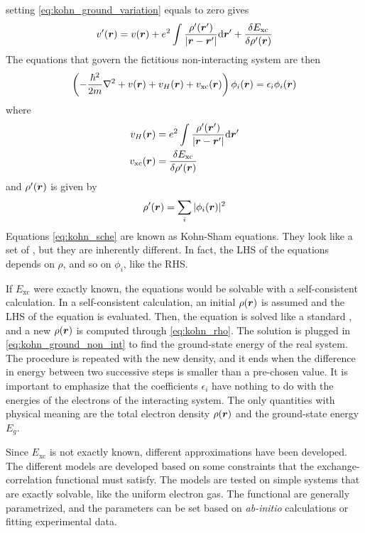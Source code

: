 setting \cref{eq:kohn_ground_variation} equals to zero gives
\begin{equation}
    \rr{v'} = \rr{v} + e^2 \int \frac{\rho'(\vec{r}')}{|\vec{r}-\vec{r}'|} \dr' + \frac{\delta E_\text{xc}}{\delta\rr{\rho'}}
\end{equation}
The equations that govern the fictitious non-interacting system are then
\begin{equation} \label{eq:kohn_sche}
    \left(-\frac{\hbar^2}{2m} \laplacian + \rr{v} + \rr{v_H} + \rr{v_\text{xc}} \right) \rr{\phi_i} = \epsilon_i \rr{\phi_i}
\end{equation}
where
\begin{align}
    \rr{v_H}         & = e^2 \int \frac{\rho'(\vec{r}')}{|\vec{r}-\vec{r}'|} \dr' \\
    \rr{v_\text{xc}} & =  \frac{\delta E_\text{xc}}{\delta\rr{\rho'}}
\end{align}
and $\rho'(\mathbf{\boldsymbol{r}})$ is given by
\begin{equation} \label{eq:kohn_rho}
    \rho'(\mathbf{\boldsymbol{r}}) = \sum_i |\phi_i(\mathbf{\boldsymbol{r}})|^2
\end{equation}
Equations \ref{eq:kohn_sche} are known as Kohn-Sham equations. They look like a set of \sches, but they are inherently different. In fact, the LHS of the equations depends on $\rho$, and so on $\phi_i$, like the RHS.

If $E_\text{xc}$ were exactly known, the equations would be solvable with a self-consistent calculation. In a self-consistent calculation, an initial $\rho(\mathbf{\boldsymbol{r}})$ is assumed and the LHS of the equation is evaluated. Then, the equation is solved like a standard \sche, and a new $\rho(\mathbf{\boldsymbol{r}})$ is computed through \cref{eq:kohn_rho}. The solution is plugged in \cref{eq:kohn_ground_non_int} to find the ground-state energy of the real system. The procedure is repeated with the new density, and it ends when the difference in energy between two successive steps is smaller than a pre-chosen value. It is important to emphasize that the coefficients $\epsilon_i$ have nothing to do with the energies of the electrons of the interacting system. The only quantities with physical meaning are the total electron density $\rho(\mathbf{\boldsymbol{r}})$ and the ground-state energy $E_g$.

Since $E_\text{xc}$ is not exactly known, different approximations have been developed. The different models are developed based on some constraints that the exchange-correlation functional must satisfy. The models are tested on simple systems that are exactly solvable, like the uniform electron gas. The functional are generally parametrized, and the parameters can be set based on \emph{ab-initio} calculations or fitting experimental data.

